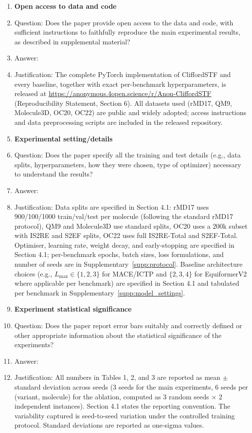 \begin{enumerate}
\item {\bf Open access to data and code}
    \item[] Question: Does the paper provide open access to the data and code, with sufficient instructions to faithfully reproduce the main experimental results, as described in supplemental material?
    \item[] Answer: \answerYes{}
    \item[] Justification: The complete PyTorch implementation of CliffordSTF and every baseline, together with exact per-benchmark hyperparameters, is released at \url{https://anonymous.4open.science/r/Anon-CliffordSTF} (Reproducibility Statement, Section 6). All datasets used (rMD17, QM9, Molecule3D, OC20, OC22) are public and widely adopted; access instructions and data preprocessing scripts are included in the released repository.

\item {\bf Experimental setting/details}
    \item[] Question: Does the paper specify all the training and test details (e.g., data splits, hyperparameters, how they were chosen, type of optimizer) necessary to understand the results?
    \item[] Answer: \answerYes{}
    \item[] Justification: Data splits are specified in Section 4.1: rMD17 uses 900/100/1000 train/val/test per molecule (following the standard rMD17 protocol), QM9 and Molecule3D use standard splits, OC20 uses a 200k subset with IS2RE and S2EF splits, OC22 uses full IS2RE-Total and S2EF-Total. Optimiser, learning rate, weight decay, and early-stopping are specified in Section 4.1; per-benchmark epochs, batch sizes, loss formulations, and number of seeds are in Supplementary~\ref{supp:protocol}. Baseline architecture choices (e.g., $L_{\max} \in \{1,2,3\}$ for MACE/ICTP and $\{2,3,4\}$ for EquiformerV2 where applicable per benchmark) are specified in Section 4.1 and tabulated per benchmark in Supplementary~\ref{supp:model_settings}.

\item {\bf Experiment statistical significance}
    \item[] Question: Does the paper report error bars suitably and correctly defined or other appropriate information about the statistical significance of the experiments?
    \item[] Answer: \answerYes{}
    \item[] Justification: All numbers in Tables 1, 2, and 3 are reported as mean $\pm$ standard deviation across seeds (3 seeds for the main experiments, 6 seeds per (variant, molecule) for the ablation, computed as 3 random seeds $\times$ 2 independent instances). Section 4.1 states the reporting convention. The variability captured is seed-to-seed variation under the controlled training protocol. Standard deviations are reported as one-sigma values.


\end{enumerate}
